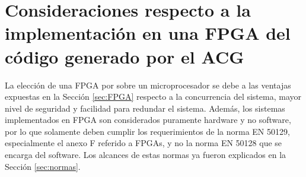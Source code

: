 \section{Consideraciones respecto a la implementación en una FPGA del código generado por el ACG}
		
	La elección de una FPGA por sobre un microprocesador se debe a las ventajas expuestas en la Sección \ref{sec:FPGA} respecto a la concurrencia del sistema, mayor nivel de seguridad y facilidad para redundar el sistema. Además, los sistemas implementados en FPGA son considerados puramente hardware y no software, por lo que solamente deben cumplir los requerimientos de la norma EN 50129, especialmente el anexo F referido a FPGAs, y no la norma EN 50128 que se encarga del software. Los alcances de estas normas ya fueron explicados en la Sección \ref{sec:normas}.